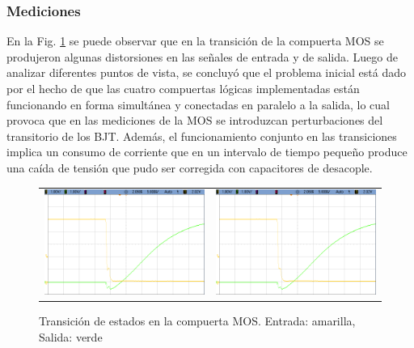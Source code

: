\subsubsection{Mediciones}
En la Fig. \ref{fig:mos_problem_signal} se puede observar que en la transici\'on de la compuerta MOS se produjeron algunas distorsiones en las se\~nales de entrada y de salida.
Luego de analizar diferentes puntos de vista, se concluy\'o que el problema inicial est\'a dado por el hecho de que las cuatro compuertas l\'ogicas implementadas est\'an funcionando
en forma simult\'anea y conectadas en paralelo a la salida, lo cual provoca que en las mediciones de la MOS se introduzcan perturbaciones del transitorio de los BJT. Adem\'as, el funcionamiento
conjunto en las transiciones implica un consumo de corriente que en un intervalo de tiempo peque\~no produce una ca\'ida de tensi\'on que pudo ser corregida con capacitores de desacople.

\begin{figure}[H]
    \centering
        \begin{tabular}{c c}
            \includegraphics[scale=0.2]{../EJ1/Mediciones/Osciloscopio/Observaciones/Mejora_transicion_MOS/cropped_scope_14.png} &
            \includegraphics[scale=0.2]{../EJ1/Mediciones/Osciloscopio/Observaciones/Mejora_transicion_MOS/cropped_scope_15.png} 
        \end{tabular}
    \caption{Transici\'on de estados en la compuerta MOS. Entrada: amarilla, Salida: verde}
    \label{fig:mos_problem_signal}
\end{figure}

